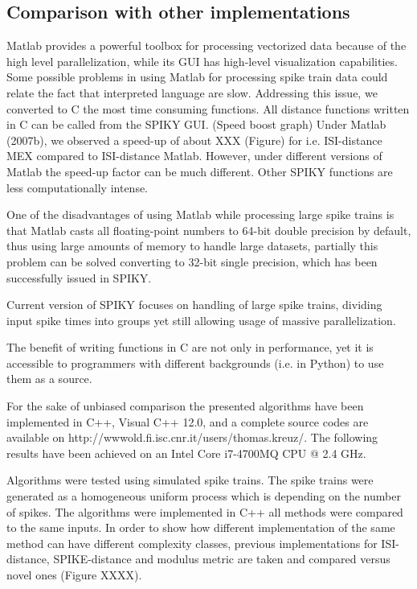 \documentclass[10pt,twocolumn]{elsart5p}
\begin{document}
\subsection{\label{ss:Comparison} Comparison with other implementations}

Matlab provides a powerful toolbox for processing vectorized data because of the high level parallelization, while its GUI has high-level visualization capabilities. Some possible problems in using Matlab for processing spike train data could relate the fact that interpreted language are slow. Addressing this issue, we converted to C the most time consuming functions. All distance functions written in C can be called from the SPIKY GUI. (Speed boost graph) Under Matlab (2007b), we observed a speed-up of about XXX (Figure) for i.e. ISI-distance MEX compared to ISI-distance Matlab. However, under different versions of Matlab the speed-up factor can be much different. Other SPIKY functions are less computationally intense.

One of the disadvantages of using Matlab while processing large spike trains is that Matlab casts all floating-point numbers to 64-bit double precision by default, thus using large amounts of memory to handle large datasets, partially this problem can be solved converting to 32-bit single precision, which has been successfully issued in SPIKY. 

Current version of SPIKY focuses on handling of large spike trains, dividing input spike times into groups yet still allowing usage of massive parallelization.

The benefit of writing functions in C are not only in performance, yet it is accessible to programmers with different backgrounds (i.e. in Python) to use them as a source.

For the sake of unbiased comparison the presented algorithms have been implemented in C++, Visual C++ 12.0, and a complete source codes are available on http://wwwold.fi.isc.cnr.it/users/thomas.kreuz/. The following results have been achieved on an Intel Core i7-4700MQ CPU @ 2.4 GHz.

Algorithms were tested using simulated spike trains. The spike trains were generated as a homogeneous uniform process which is depending on the number of spikes. The algorithms were implemented in C++ all methods were compared to the same inputs. In order to show how different implementation of the same method can have different complexity classes, previous implementations for ISI-distance, SPIKE-distance and modulus metric are taken and compared versus novel ones (Figure XXXX).
\end{document}
